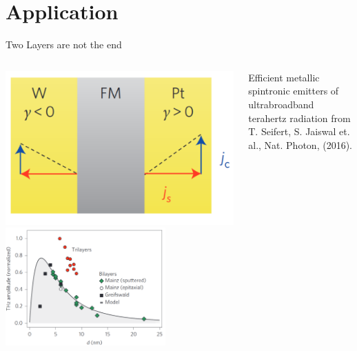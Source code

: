 \documentclass[aspectratio=1610, 9pt]{beamer}
\begin{document}
\section{Application}
\begin{frame}{Two Layers are not the end}
  \begin{center}
  \begin{columns}
    \begin{column}{0.5\textwidth}
      \begin{center}
        \hspace{0.1in}
        \includegraphics[width=.6\textwidth]{pics/trilayer.png}
        \includegraphics[width=0.7\textwidth]{pics/aplitude.png}
        \nocite{seifert2016efficient}
      \end{center}
    \end{column}
    \begin{column}{.5\textwidth}
      \begin{center}
        \small\textcolor{tugreen}{Efficient metallic spintronic emitters of ultrabroadband terahertz radiation} from T. Seifert, S. Jaiswal et. al., Nat. Photon, (2016).
        \vspace{0.2in}

\end{center}
\end{column}
\end{columns}
\end{center}
\end{frame}
\end{document}
